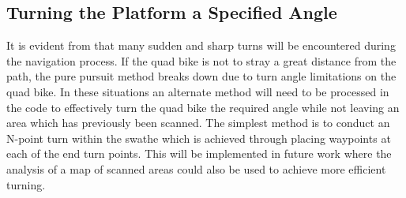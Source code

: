 \documentclass[main.tex]{subfiles}
\begin{document}
\subsection{Turning the Platform a Specified Angle}
It is evident from  that many sudden and sharp turns will be encountered during the navigation process. If the quad bike is not to stray a great distance from the path, the pure pursuit method breaks down due to turn angle limitations on the quad bike.  In these situations an alternate method will need to be processed in the code to effectively turn the quad bike the required angle while not leaving an area which has previously been scanned. The simplest method is to conduct an N-point turn within the swathe which is achieved through placing waypoints at each of the end turn points. This will be implemented in future work where the analysis of a map of scanned areas could also be used to achieve more efficient turning. 
\end{document}
